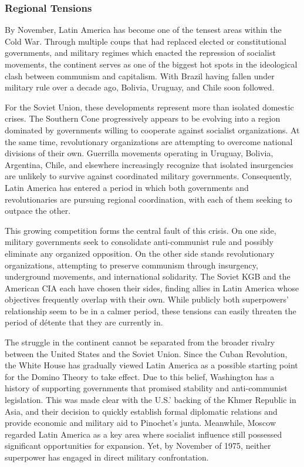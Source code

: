 \subsubsection{Regional Tensions}

By November, Latin America has become one of the tensest areas within the Cold War. Through multiple coups that had replaced elected or constitutional governments, and military regimes which enacted the repression of socialist movements, the continent serves as one of the biggest hot spots in the ideological clash between communism and capitalism. With Brazil having fallen under military rule over a decade ago, Bolivia, Uruguay, and Chile soon followed.

For the Soviet Union, these developments represent more than isolated domestic crises. The Southern Cone progressively appears to be evolving into a region dominated by governments willing to cooperate against socialist organizations. At the same time, revolutionary organizations are attempting to overcome national divisions of their own. Guerrilla movements operating in Uruguay, Bolivia, Argentina, Chile, and elsewhere increasingly recognize that isolated insurgencies are unlikely to survive against coordinated military governments. Consequently, Latin America has entered a period in which both governments and revolutionaries are pursuing regional coordination, with each of them seeking to outpace the other.

This growing competition forms the central fault of this crisis. On one side, military governments seek to consolidate anti-communist rule and possibly eliminate any organized opposition. On the other side stands revolutionary organizations, attempting to preserve communism through insurgency, underground movements, and international solidarity. The Soviet KGB and the American CIA each have chosen their sides, finding allies in Latin America whose objectives frequently overlap with their own. While publicly both superpowers’ relationship seem to be in a calmer period, these tensions can easily threaten the period of détente that they are currently in.


The struggle in the continent cannot be separated from the broader rivalry between the United States and the Soviet Union. Since the Cuban Revolution, the White House has gradually viewed Latin America as a possible starting point for the Domino Theory to take effect. Due to this belief, Washington has a history of supporting governments that promised stability and anti-communist legislation. This was made clear with the U.S.’ backing of the Khmer Republic in Asia, and their decision to quickly establish formal diplomatic relations and provide economic and military aid to Pinochet's junta. Meanwhile, Moscow regarded Latin America as a key area where socialist influence still possessed significant opportunities for expansion. Yet, by November of 1975, neither superpower has engaged in direct military confrontation.

